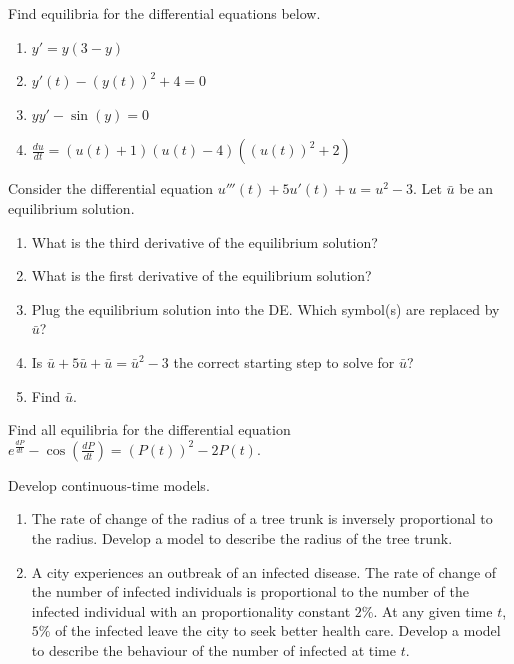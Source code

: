 \documentclass[../main.tex]{subfiles}
\begin{document}
\begin{exercise}
  Find equilibria for the differential equations below.

  \begin{enumerate}
    \item \(y' = y(3-y)\)
    \item \(y'(t) - (y(t))^{2} + 4 = 0\)
    \item \(yy' - \sin(y) = 0\)
    \item \(\frac{du}{dt} = (u(t)+1)(u(t)-4)((u(t))^{2}+2)\)
  \end{enumerate}
\end{exercise}

\begin{exercise}
  Consider the differential equation \(u'''(t) + 5u'(t) + u = u^{2} - 3\). Let \(\bar{u}\) be an equilibrium solution. 

  \begin{enumerate}
    \item What is the third derivative of the equilibrium solution?

    \item What is the first derivative of the equilibrium solution?

    \item Plug the equilibrium solution into the DE. Which symbol(s) are replaced by \(\bar{u}\)?

    \item Is \(\bar{u} + 5 \bar{u} + \bar{u} = \bar{u}^{2} - 3\) the correct starting step to solve for \(\bar{u}\)?

    \item Find \(\bar{u}\).
  \end{enumerate}
\end{exercise}

\begin{exercise}
  Find all equilibria for the differential equation \(e^{\frac{dP}{dt}} - \cos\left( \frac{dP}{dt} \right) = (P(t))^{2} - 2P(t)\).
\end{exercise}

\begin{exercise}
  Develop continuous-time models.
  \begin{enumerate}
    \item The rate of change of the radius of a tree trunk is inversely proportional to the radius. Develop a model to describe the radius of the tree trunk.
    \item A city experiences an outbreak of an infected disease. The rate of change of the number of infected individuals is proportional to the number of the infected individual with an proportionality constant \(2\%\).  At any given time \(t\), \(5\%\) of the infected leave the city to seek better health care.   Develop a model to describe the behaviour of the number of infected at time \(t\).
  \end{enumerate}
\end{exercise}
\end{document}

